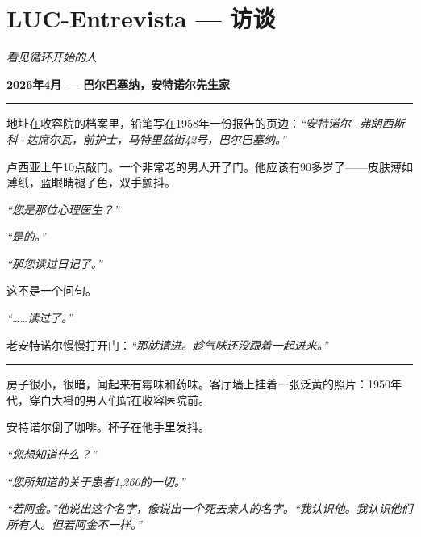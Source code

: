\section*{\textbf{LUC-Entrevista} --- 访谈}

\noindent \textit{看见循环开始的人}

\noindent \textbf{2026年4月 --- 巴尔巴塞纳，安特诺尔先生家}

\vspace{0.5em}\noindent\rule{\textwidth}{0.5pt}\vspace{0.5em}

\noindent 地址在收容院的档案里，铅笔写在1958年一份报告的页边：\textit{\textquotedblleft{}安特诺尔·弗朗西斯科·达席尔瓦，前护士，马特里兹街42号，巴尔巴塞纳。\textquotedblright{}}

\noindent 卢西亚上午10点敲门。一个非常老的男人开了门。他应该有90多岁了——皮肤薄如薄纸，蓝眼睛褪了色，双手颤抖。

\noindent \textit{\textquotedblleft{}您是那位心理医生？\textquotedblright{}}

\noindent \textit{\textquotedblleft{}是的。\textquotedblright{}}

\noindent \textit{\textquotedblleft{}那您读过日记了。\textquotedblright{}}

\noindent 这不是一个问句。

\noindent \textit{\textquotedblleft{}……读过了。\textquotedblright{}}

\noindent 老安特诺尔慢慢打开门：\textit{\textquotedblleft{}那就请进。趁气味还没跟着一起进来。\textquotedblright{}}

\vspace{0.5em}\noindent\rule{\textwidth}{0.5pt}\vspace{0.5em}

\noindent 房子很小，很暗，闻起来有霉味和药味。客厅墙上挂着一张泛黄的照片：1950年代，穿白大褂的男人们站在收容医院前。

\noindent 安特诺尔倒了咖啡。杯子在他手里发抖。

\noindent \textit{\textquotedblleft{}您想知道什么？\textquotedblright{}}

\noindent \textit{\textquotedblleft{}您所知道的关于患者1,260的一切。\textquotedblright{}}

\noindent \textit{\textquotedblleft{}若阿金。\textquotedblright{}他说出这个名字，像说出一个死去亲人的名字。\textquotedblleft{}我认识他。我认识他们所有人。但若阿金不一样。\textquotedblright{}}


